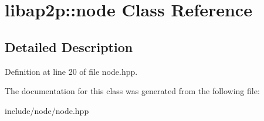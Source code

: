 \hypertarget{classlibap2p_1_1node}{\section{libap2p\-:\-:node Class Reference}
\label{classlibap2p_1_1node}
}


\subsection{Detailed Description}


Definition at line 20 of file node.\-hpp.



The documentation for this class was generated from the following file\-:\begin{DoxyCompactItemize}
\item 
include/node/node.\-hpp\end{DoxyCompactItemize}
